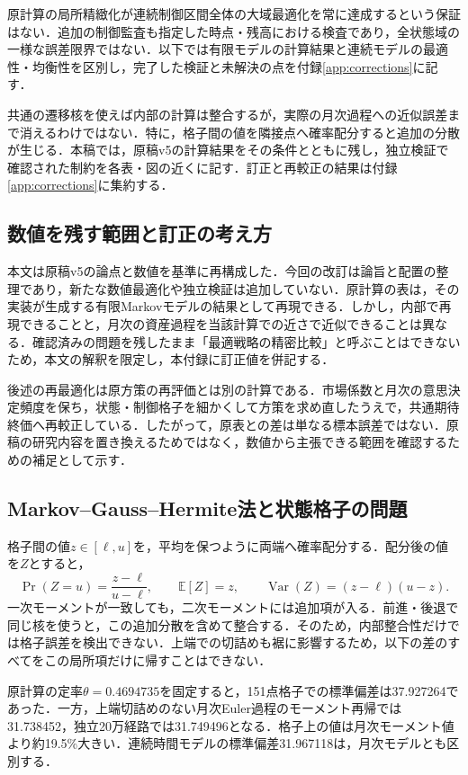 \documentclass[10pt,a4paper]{article}
\theoremstyle{plain}
\theoremstyle{definition}
\newcommand{\E}{\mathbb{E}}
\DeclareMathOperator{\Var}{Var}
\begin{document}
原計算の局所精緻化が連続制御区間全体の大域最適化を常に達成するという保証はない．追加の制御監査も指定した時点・残高における検査であり，全状態域の一様な誤差限界ではない．以下では有限モデルの計算結果と連続モデルの最適性・均衡性を区別し，完了した検証と未解決の点を付録\ref{app:corrections}に記す．

共通の遷移核を使えば内部の計算は整合するが，実際の月次過程への近似誤差まで消えるわけではない．特に，格子間の値を隣接点へ確率配分すると追加の分散が生じる．本稿では，原稿v5の計算結果をその条件とともに残し，独立検証で確認された制約を各表・図の近くに記す．訂正と再較正の結果は付録\ref{app:corrections}に集約する．

\subsection{数値を残す範囲と訂正の考え方}
本文は原稿v5の論点と数値を基準に再構成した．今回の改訂は論旨と配置の整理であり，新たな数値最適化や独立検証は追加していない．原計算の表は，その実装が生成する有限Markovモデルの結果として再現できる．しかし，内部で再現できることと，月次の資産過程を当該計算での近さで近似できることは異なる．確認済みの問題を残したまま「最適戦略の精密比較」と呼ぶことはできないため，本文の解釈を限定し，本付録に訂正値を併記する．

後述の再最適化は原方策の再評価とは別の計算である．市場係数と月次の意思決定頻度を保ち，状態・制御格子を細かくして方策を求め直したうえで，共通期待終価へ再較正している．したがって，原表との差は単なる標本誤差ではない．原稿の研究内容を置き換えるためではなく，数値から主張できる範囲を確認するための補足として示す．

\subsection{Markov--Gauss--Hermite法と状態格子の問題}
格子間の値$z\in[\ell,u]$を，平均を保つように両端へ確率配分する．配分後の値を$Z$とすると，
\begin{equation}
\Pr(Z=u)=\frac{z-\ell}{u-\ell},\qquad
\E[Z]=z,\qquad \Var(Z)=(z-\ell)(u-z).
\end{equation}
一次モーメントが一致しても，二次モーメントには追加項が入る．前進・後退で同じ核を使うと，この追加分散を含めて整合する．そのため，内部整合性だけでは格子誤差を検出できない．上端での切詰めも裾に影響するため，以下の差のすべてをこの局所項だけに帰すことはできない．

原計算の定率$\theta=0.4694735$を固定すると，151点格子での標準偏差は37.927264であった．一方，上端切詰めのない月次Euler過程のモーメント再帰では31.738452，独立20万経路では31.749496となる．格子上の値は月次モーメント値より約19.5\%大きい．連続時間モデルの標準偏差31.967118は，月次モデルとも区別する．
\end{document}
